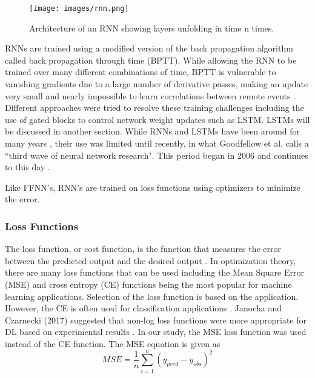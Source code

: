 %
\begin{figure}[H]
\centering
\texttt{[image: images/rnn.png]}  %
\caption{Architecture of an RNN showing layers unfolding in time n times.}
\label{fig:rnn}
\end{figure}
%

RNNs are trained using a modified version of the back propagation algorithm called back propagation through time (BPTT). While allowing the RNN to be trained over many different combinations of time, BPTT is vulnerable to vanishing gradients due to a large number of derivative passes, making an update very small and nearly impossible to learn correlations between remote events \citep{Pascanu2013, Graves2013a}. Different approaches were tried to resolve these training challenges including the use of gated blocks to control network weight updates such as LSTM. LSTMs will be discussed in another section. While RNNs and LSTMs have been around for many years \citep{Hochreiter1997}, their use was limited until recently, in what Goodfellow et al. calls a ``third wave of neural network research". This period began in 2006 and continues to this day \citep{Goodfellow2016}.

Like FFNN's, RNN's are trained on loss functions using optimizers to minimize the error. 

\subsubsection{Loss Functions}

The loss function, or cost function, is the function that measures the error between the predicted output and the desired output \citep{Goodfellow2016}. In optimization theory, there are many loss functions that can be used including the Mean Square Error (MSE) and cross entropy (CE) functions being the most popular for machine learning applications.  Selection of the loss function is based on the application. However, the CE is often used for classification applications \citep{Kline2005, Wu2017}. Janocha and Czarnecki (2017) suggested that non-log loss functions were more appropriate for DL based on experimental results \citep{Janocha2017}. In our study, the MSE loss function was used instead of the CE function. The MSE equation is given as 
%
\begin{equation}
\label{eq:MSE}
MSE = \frac{1}{n} \sum_{i=1}^{n} \left( y_{pred} - y_{obs} \right)^{2}
\end{equation}
%

